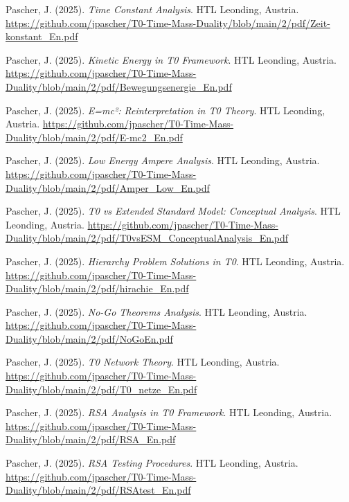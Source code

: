 \documentclass{article}
\begin{document}
\begin{thebibliography}{99}
		Pascher, J. (2025).
		\textit{Time Constant Analysis}.
		HTL Leonding, Austria.
		\url{https://github.com/jpascher/T0-Time-Mass-Duality/blob/main/2/pdf/Zeit-konstant_En.pdf}
		
		Pascher, J. (2025).
		\textit{Kinetic Energy in T0 Framework}.
		HTL Leonding, Austria.
		\url{https://github.com/jpascher/T0-Time-Mass-Duality/blob/main/2/pdf/Bewegungsenergie_En.pdf}
		
		Pascher, J. (2025).
		\textit{E=mc²: Reinterpretation in T0 Theory}.
		HTL Leonding, Austria.
		\url{https://github.com/jpascher/T0-Time-Mass-Duality/blob/main/2/pdf/E-mc2_En.pdf}
		
		Pascher, J. (2025).
		\textit{Low Energy Ampere Analysis}.
		HTL Leonding, Austria.
		\url{https://github.com/jpascher/T0-Time-Mass-Duality/blob/main/2/pdf/Amper_Low_En.pdf}
		
		
		Pascher, J. (2025).
		\textit{T0 vs Extended Standard Model: Conceptual Analysis}.
		HTL Leonding, Austria.
		\url{https://github.com/jpascher/T0-Time-Mass-Duality/blob/main/2/pdf/T0vsESM_ConceptualAnalysis_En.pdf}
		
		Pascher, J. (2025).
		\textit{Hierarchy Problem Solutions in T0}.
		HTL Leonding, Austria.
		\url{https://github.com/jpascher/T0-Time-Mass-Duality/blob/main/2/pdf/hirachie_En.pdf}
		
		Pascher, J. (2025).
		\textit{No-Go Theorems Analysis}.
		HTL Leonding, Austria.
		\url{https://github.com/jpascher/T0-Time-Mass-Duality/blob/main/2/pdf/NoGoEn.pdf}
		
		Pascher, J. (2025).
		\textit{T0 Network Theory}.
		HTL Leonding, Austria.
		\url{https://github.com/jpascher/T0-Time-Mass-Duality/blob/main/2/pdf/T0_netze_En.pdf}
		
		
		Pascher, J. (2025).
		\textit{RSA Analysis in T0 Framework}.
		HTL Leonding, Austria.
		\url{https://github.com/jpascher/T0-Time-Mass-Duality/blob/main/2/pdf/RSA_En.pdf}
		
		Pascher, J. (2025).
		\textit{RSA Testing Procedures}.
		HTL Leonding, Austria.
		\url{https://github.com/jpascher/T0-Time-Mass-Duality/blob/main/2/pdf/RSAtest_En.pdf}
		

\end{thebibliography}
\end{document}

